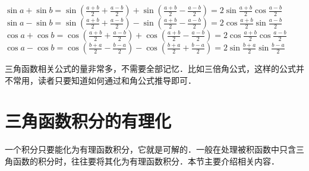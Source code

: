 \documentclass{ctexbook}
\begin{document}
$\sin{a}+\sin{b}=\sin{\left(\frac{a+b}{2}+\frac{a-b}{2}\right)}+\sin{\left(\frac{a+b}{2}-\frac{a-b}{2}\right)}=2\sin{\frac{a+b}{2}}\cos{\frac{a-b}{2}}$\\
$\sin{a}-\sin{b}=\sin{\left(\frac{a+b}{2}+\frac{a-b}{2}\right)}-\sin{\left(\frac{a+b}{2}-\frac{a-b}{2}\right)}=2\cos{\frac{a+b}{2}}\sin{\frac{a-b}{2}}$\\
$\cos{a}+\cos{b}=\cos{\left(\frac{a+b}{2}+\frac{a-b}{2}\right)}+\cos{\left(\frac{a+b}{2}-\frac{a-b}{2}\right)}=2\cos{\frac{a+b}{2}}\cos{\frac{a-b}{2}}$\\
$\cos{a}-\cos{b}=\cos{\left(\frac{b+a}{2}-\frac{b-a}{2}\right)}-\cos{\left(\frac{b+a}{2}+\frac{b-a}{2}\right)}=2\sin{\frac{b+a}{2}}\sin{\frac{b-a}{2}}$\par
三角函数相关公式的量非常多，不需要全部记忆．比如三倍角公式，这样的公式并不常用，读者只要知道如何通过和角公式推导即可．\par
\section{三角函数积分的有理化}
一个积分只要能化为有理函数积分，它就是可解的．一般在处理被积函数中只含三角函数的积分时，往往要将其化为有理函数积分．本节主要介绍相关内容．\par
\end{document}
